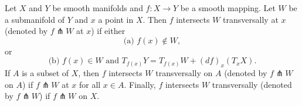 Let $X$ and $Y$ be smooth manifolds and $f: X \to Y$ be a smooth mapping. Let $W$ be a submanifold of $Y$ and $x$ a point in $X$. Then $f$ intersects $W$ transversally at $x$ (denoted by $f \pitchfork W$ at $x$) if either
$$
\text{(a) } f(x) \notin W,
$$
or
$$
\text{(b) } f(x) \in W \text{ and } T_{f(x)}Y = T_{f(x)}W + (df)_x(T_x X).
$$
If $A$ is a subset of $X$, then $f$ intersects $W$ transversally on $A$ (denoted by $f \pitchfork W$ on $A$) if $f \pitchfork W$ at $x$ for all $x \in A$. Finally, $f$ intersects $W$ transversally (denoted by $f \pitchfork W$) if $f \pitchfork W$ on $X$.
